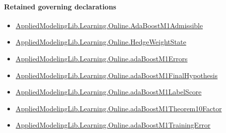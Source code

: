 \documentclass[10pt]{article}
\begin{document}
\paragraph{Retained governing declarations}
\begin{itemize}\raggedright
\item \hyperlink{governing-declaration-69881f7b779e3d0f}{Applied\allowbreak{}Modeling\allowbreak{}Lib.\allowbreak{}Learning.\allowbreak{}Online.\allowbreak{}Ada\allowbreak{}Boost\allowbreak{}M1\allowbreak{}Admissible}
\item \hyperlink{library-prerequisite-8196082d02788389}{Applied\allowbreak{}Modeling\allowbreak{}Lib.\allowbreak{}Learning.\allowbreak{}Online.\allowbreak{}Hedge\allowbreak{}Weight\allowbreak{}State}
\item \hyperlink{governing-declaration-48c8333cad4e8e7e}{Applied\allowbreak{}Modeling\allowbreak{}Lib.\allowbreak{}Learning.\allowbreak{}Online.\allowbreak{}ada\allowbreak{}Boost\allowbreak{}M1\allowbreak{}Errors}
\item \hyperlink{governing-declaration-500ac1170d527a78}{Applied\allowbreak{}Modeling\allowbreak{}Lib.\allowbreak{}Learning.\allowbreak{}Online.\allowbreak{}ada\allowbreak{}Boost\allowbreak{}M1\allowbreak{}Final\allowbreak{}Hypothesis}
\item \hyperlink{library-prerequisite-3e4d395ab09bf43b}{Applied\allowbreak{}Modeling\allowbreak{}Lib.\allowbreak{}Learning.\allowbreak{}Online.\allowbreak{}ada\allowbreak{}Boost\allowbreak{}M1\allowbreak{}Label\allowbreak{}Score}
\item \hyperlink{governing-declaration-06191eacd2ca1ced}{Applied\allowbreak{}Modeling\allowbreak{}Lib.\allowbreak{}Learning.\allowbreak{}Online.\allowbreak{}ada\allowbreak{}Boost\allowbreak{}M1\allowbreak{}Theorem10\allowbreak{}Factor}
\item \hyperlink{governing-declaration-53dbc737680b05a9}{Applied\allowbreak{}Modeling\allowbreak{}Lib.\allowbreak{}Learning.\allowbreak{}Online.\allowbreak{}ada\allowbreak{}Boost\allowbreak{}M1\allowbreak{}Training\allowbreak{}Error}
\end{itemize}
\end{document}
